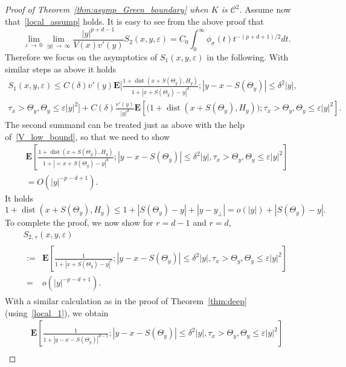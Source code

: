 \documentclass[AHL,Unicode,longabstracts,published]{cedram}
\DeclareMathOperator{\dist}{dist}
\newcommand{\clC}{\mathcal{C}}
\newcommand{\e}{\mathbf{E}}
\renewcommand{\le}{\leqslant}
\begin{document}
\begin{proof}[Proof of Theorem~\ref{thm:asymp_Green_boundary} when $K$ is $\clC^{2}$]
Assume now that~\eqref{local_assump} holds. It is easy to see from the above proof that
\begin{equation}
\lim_{\varepsilon\,\to\,0}\lim_{|y|\,\to\,\infty}\frac{|y|^{p+d-1}}{V(x)v'(y)}S_2(x,y,\varepsilon) =C_0\int_0^\infty \phi_\sigma(t) t^{-(p+d+1)/2}dt.
\end{equation}
Therefore we focus on the asymptotics of $S_1(x,y,\varepsilon)$ in the following. With similar steps as above it holds
\begin{multline*}
S_1(x,y,\varepsilon)
\le C(\delta)v'(y)\e\bigg[\frac{1+\dist\left(x+S\left(\Theta_y\right),H_y\right)}{1+\left|x+S\left(\Theta_y\right)-y\right|^d};\left|y-x-S\left(\Theta_y\right)\right|\le\delta^2|y|,\\
\tau_x>\Theta_y,\Theta_y\le\varepsilon|y|^2\!\bigg]\!
+ C(\delta)\frac{v'(y)}{|y|^d}\e\left[\big(1+\dist\left(x+S\left(\Theta_y\right),H_y\right)\!\!\big);
\tau_x>\Theta_y,\Theta_y\le\varepsilon|y|^2\right]\!.
\end{multline*}
The second summand can be treated just as above with the help of~\eqref{V_low_bound}, so that we need to show
\begin{multline*}
\e\left[\frac{1+\dist\left(x+S\left(\Theta_y\right),H_y\right)}{1+\left|=x+S\left(\Theta_y\right)-y\right|^d};\left|y-x-S\left(\Theta_y\right)\right|\le\delta^2|y|,\tau_x>\Theta_y,\Theta_y\le\varepsilon|y|^2\right]\\
= O\left(|y|^{-p-d+1}\right).
\end{multline*}
It holds
\[
1+\dist\left(x+S\left(\Theta_y\right),H_y\right)\le 1+\left|S\left(\Theta_y\right)-y\right|+\left|y-y_{\perp}\right|= o(|y|)+\left|S\left(\Theta_y\right)-y\right|.
\]
To complete the proof, we now show for $r = d-1$ and $r=d$,
\begin{multline*}\label{eq:helpass4}
S_{2,\,r}(x,y,\varepsilon)\\
\begin{aligned}
:=& \e\left[\frac{1}{1+\left|x+S\left(\Theta_y\right)-y\right|^{r}};\left|y-x-S\left(\Theta_y\right)\right|\le\delta^2|y|,\tau_x>\Theta_y,\Theta_y\le\varepsilon|y|^2\right]\\
 =& o\left(|y|^{-p-d+1}\right).
\end{aligned}
\end{multline*}
With a similar calculation as in the proof of Theorem~\ref{thm:deep} (using~\eqref{local_1}), we obtain
\begin{multline*}
\e\left[\frac{1}{1+\left|y-x-S\left(\Theta_y\right)\right|^{d-1}};\left|y-x-S\left(\Theta_y\right)\right|\le\delta^2|y|,\tau_x>\Theta_y,\Theta_y\le\varepsilon|y|^2\right]\\

\end{multline*}
\end{proof}
\end{document}
